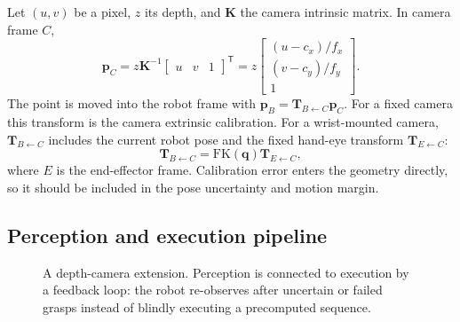 \documentclass{article}
\begin{document}
Let $(u,v)$ be a pixel, $z$ its depth, and
$\mathbf{K}$ the camera intrinsic matrix. In camera frame $C$,
\begin{equation}\label{eq:backproject}
  \mathbf{p}_C
  =
  z\mathbf{K}^{-1}
  \begin{bmatrix}u&v&1\end{bmatrix}^{\mathsf T}
  =
  z
  \begin{bmatrix}
    (u-c_x)/f_x\\
    (v-c_y)/f_y\\
    1
  \end{bmatrix}.
\end{equation}
The point is moved into the robot frame with
$\mathbf{p}_B=\mathbf{T}_{B\leftarrow C}\mathbf{p}_C$. For a fixed camera this
transform is the camera extrinsic calibration. For a wrist-mounted camera,
$\mathbf{T}_{B\leftarrow C}$ includes the current robot pose and the fixed
hand-eye transform $\mathbf{T}_{E\leftarrow C}$:
\begin{equation}\label{eq:handeye}
  \mathbf{T}_{B\leftarrow C}
  =
  \mathrm{FK}(\mathbf{q})\mathbf{T}_{E\leftarrow C},
\end{equation}
where $E$ is the end-effector frame. Calibration error enters the geometry
directly, so it should be included in the pose uncertainty and motion margin.

\subsection{Perception and execution pipeline}

\begin{figure}[t]
\centering
{}
\caption{A depth-camera extension. Perception is connected to execution by a
feedback loop: the robot re-observes after uncertain or failed grasps instead
of blindly executing a precomputed sequence.}
\label{fig:pipeline}
\end{figure}
\end{document}
